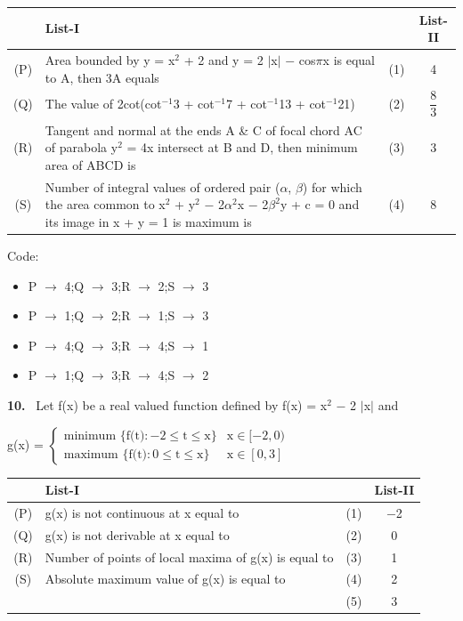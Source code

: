 \documentclass[10pt]{extarticle}
\newcommand{\qn}[1]{\par\smallskip\noindent\textbf{#1.}~}
\newenvironment{qoptions}{\begin{itemize}[leftmargin=1.8em,itemsep=1pt,topsep=2pt,label={}]}{\end{itemize}}
\newcommand{\opt}[2]{\item[(#1)] #2}
\begin{document}
\begin{multicols}{2}
{\begin{tabular}{|c|L{4.8cm}|c|c|}
\hline
 & List-I & & List-II \\
\hline
(P) & Area bounded by y = x$^2$ + 2 and y = 2 $|$x$|$ $-$ cos$\pi$x is equal to A, then 3A equals & (1) & 4 \\
\hline
(Q) & The value of 2cot(cot$^{-1}$3 + cot$^{-1}$7 + cot$^{-1}$13 + cot$^{-1}$21) & (2) & $\dfrac{8}{3}$ \\
\hline
(R) & Tangent and normal at the ends A \& C of focal chord AC of parabola y$^2$ = 4x intersect at B and D, then minimum area of ABCD is & (3) & 3 \\
\hline
(S) & Number of integral values of ordered pair ($\alpha$, $\beta$) for which the area common to x$^2$ + y$^2$ $-$ 2$\alpha^2$x $-$ 2$\beta^2$y + c = 0 and its image in x + y = 1 is maximum is & (4) & 8 \\
\hline
\end{tabular}}\par
Code:
\begin{qoptions}
\opt{A}{P $\rightarrow$ 4;Q $\rightarrow$ 3;R $\rightarrow$ 2;S $\rightarrow$ 3}
\opt{B}{P $\rightarrow$ 1;Q $\rightarrow$ 2;R $\rightarrow$ 1;S $\rightarrow$ 3}
\opt{C}{P $\rightarrow$ 4;Q $\rightarrow$ 3;R $\rightarrow$ 4;S $\rightarrow$ 1}
\opt{D}{P $\rightarrow$ 1;Q $\rightarrow$ 3;R $\rightarrow$ 4;S $\rightarrow$ 2}
\end{qoptions}
\qn{10} Let f(x) be a real valued function defined by f(x) = x$^2$ $-$ 2 $|$x$|$ and\par
g(x) = $\begin{cases}\text{minimum }\{\text{f(t)}:-2\leq\text{t}\leq\text{x}\} & \text{x}\in[-2,0)\\ \text{maximum }\{\text{f(t)}:0\leq\text{t}\leq\text{x}\} & \text{x}\in[0,3]\end{cases}$\par
{\footnotesize\setlength{\tabcolsep}{1.5pt}\noindent\begin{tabular}{|c|L{4.8cm}|c|c|}
\hline
 & List-I & & List-II \\
\hline
(P) & g(x) is not continuous at x equal to & (1) & $-$2 \\
\hline
(Q) & g(x) is not derivable at x equal to & (2) & 0 \\
\hline
(R) & Number of points of local maxima of g(x) is equal to & (3) & 1 \\
\hline
(S) & Absolute maximum value of g(x) is equal to & (4) & 2 \\
\hline
 & & (5) & 3 \\
\hline
\end{tabular}}\par

\end{multicols}
\end{document}

